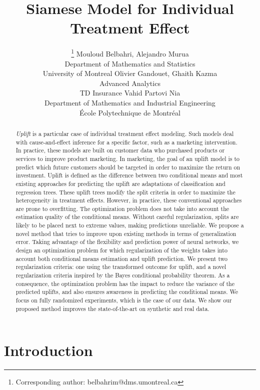 \documentclass{article}
\title{Siamese Model for Individual Treatment Effect}
\author{
  \thanks{Corresponding author: belbahrim@dms.umontreal.ca} Mouloud Belbahri, Alejandro Murua \\
  Department of Mathematics and Statistics\\
  University of Montreal
  \And
  Olivier Gandouet, Ghaith Kazma \\
  Advanced Analytics\\
  TD Insurance
  \And
  Vahid Partovi Nia \\
  Department of Mathematics and Industrial Engineering\\
  École Polytechnique de Montréal
}
\begin{document}
\maketitle

\begin{abstract}
\textit{Uplift} is a particular case of individual treatment effect modeling. Such models deal with cause-and-effect inference for a specific factor, such as a marketing intervention. In practice, these models are built on customer data who purchased products or services to improve product marketing. In marketing, the goal of an uplift model is to predict which future customers should be targeted in order to maximize the return on investment. Uplift is defined as the difference between two conditional means and most existing approaches for predicting the uplift are adaptations of classification and regression trees. These uplift trees modify the split criteria in order to maximize the heterogeneity in treatment effects. However, in practice, these conventional approaches are prone to overfitting. The optimization problem does not take into account the estimation quality of the conditional means. Without careful regularization, splits are likely to be placed next to extreme values, making predictions unreliable. 
%
We propose a novel method that tries to improve upon existing methods in terms of generalization error. Taking advantage of the flexibility and prediction power of neural networks, we design an optimization problem for which regularization of the weights takes into account both conditional means estimation and uplift prediction. We present two regularization criteria: one using the transformed outcome for uplift, and a novel regularization criteria inspired by the Bayes conditional probability theorem. 
%
As a consequence, the optimization problem has the impact to reduce the variance of the predicted uplifts, and also ensures awareness in predicting the conditional means. We focus on fully randomized experiments, which is the case of our data. We show our proposed method improves the state-of-the-art on synthetic and real data.
\end{abstract}



\section{Introduction}
\label{sec:intro}
\end{document}
